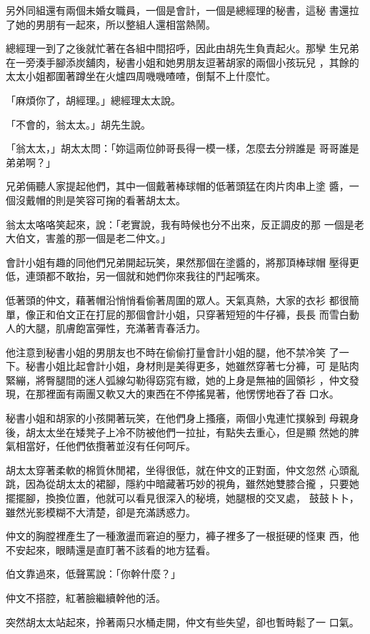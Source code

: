 另外同組還有兩個未婚女職員，一個是會計，一個是總經理的秘書，這秘
書還拉了她的男朋有一起來，所以整組人還相當熱鬧。

總經理一到了之後就忙著在各組中間招呼，因此由胡先生負責起火。那孿
生兄弟在一旁湊手腳添炭舖肉，秘書小姐和她男朋友逗著胡家的兩個小孩玩兒
，其餘的太太小姐都圍著蹲坐在火爐四周嘰嘰喳喳，倒幫不上什麼忙。

「麻煩你了，胡經理。」總經理太太說。

「不會的，翁太太。」胡先生說。

「翁太太，」胡太太問：「妳這兩位帥哥長得一模一樣，怎麼去分辨誰是
哥哥誰是弟弟啊？」

兄弟倆聽人家提起他們，其中一個戴著棒球帽的低著頭猛在肉片肉串上塗
醬，一個沒戴帽的則是笑容可掬的看著胡太太。

翁太太咯咯笑起來，說：「老實說，我有時候也分不出來，反正調皮的那
一個是老大伯文，害羞的那一個是老二仲文。」

會計小姐有趣的同他們兄弟開起玩笑，果然那個在塗醬的，將那頂棒球帽
壓得更低，連頭都不敢抬，另一個就和她們你來我往的鬥起嘴來。

低著頭的仲文，藉著帽沿悄悄看偷著周圍的眾人。天氣真熱，大家的衣衫
都很簡單，像正和伯文正在打屁的那個會計小姐，只穿著短短的牛仔褲，長長
而雪白動人的大腿，肌膚飽富彈性，充滿著青春活力。

他注意到秘書小姐的男朋友也不時在偷偷打量會計小姐的腿，他不禁冷笑
了一下。秘書小姐比起會計小姐，身材則是美得更多，她雖然穿著七分褲，可
是貼肉緊繃，將臀腿間的迷人弧線勾勒得窈窕有緻，她的上身是無袖的圓領衫
，仲文發現，在那裡面有兩團又軟又大的東西在不停搖晃著，他愣愣地吞了吞
口水。

秘書小姐和胡家的小孩開著玩笑，在他們身上搔癢，兩個小鬼連忙撲躲到
母親身後，胡太太坐在矮凳子上冷不防被他們一拉扯，有點失去重心，但是顯
然她的脾氣相當好，任他們依攬著並沒有任何呵斥。

胡太太穿著柔軟的棉質休閒裙，坐得很低，就在仲文的正對面，仲文忽然
心頭亂跳，因為從胡太太的裙腳，隱約中暗藏著巧妙的視角，雖然她雙膝合攏
，只要她擺擺腳，換換位置，他就可以看見很深入的秘境，她腿根的交叉處，
鼓鼓卜卜，雖然光影模糊不大清楚，卻是充滿誘惑力。

仲文的胸膛裡產生了一種激盪而窘迫的壓力，褲子裡多了一根挺硬的怪東
西，他不安起來，眼睛還是直盯著不該看的地方猛看。

伯文靠過來，低聲罵說：「你幹什麼？」

仲文不搭腔，紅著臉繼續幹他的活。

突然胡太太站起來，拎著兩只水桶走開，仲文有些失望，卻也暫時鬆了一
口氣。

